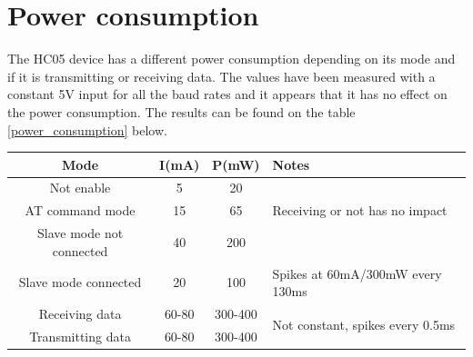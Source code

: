 \documentclass[11pt]{article}
\begin{document}
\section{Power consumption}
The HC05 device has a different power consumption depending on its mode and if it is transmitting or receiving data. The values have been measured with a constant 5V input for all the baud rates and it appears that it has no effect on the power consumption. The results can be found on the table \ref{power_consumption} below.

\begin{center}
\label{power_consumption}
\begin{tabular}{|c|c|c|l|}
\hline
Mode & I(mA) & P(mW) & Notes\\
\hline
Not enable & 5 & 20 & \\
\hline
AT command mode & 15 & 65 & Receiving or not has no impact\\
\hline
Slave mode not connected & 40 & 200 & \\
\hline
Slave mode connected & 20 & 100 & Spikes at 60mA/300mW every 130ms\\
\hline
Receiving data & 60-80 & 300-400 & \multirow{2}{*}{Not constant, spikes every 0.5ms}\\
\cline{1-3}
Transmitting data & 60-80 & 300-400 & \\
\hline
\end{tabular}
\end{center}
\end{document}
